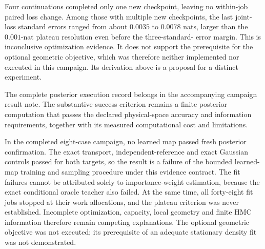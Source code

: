Four continuations completed only one new checkpoint, leaving no within-job
paired loss change. Among those with multiple new checkpoints, the last
joint-loss standard errors ranged from about $0.0035$ to $0.0078$ nats,
larger than the $0.001$-nat plateau resolution even before the three-standard-
error margin. This is inconclusive optimization evidence. It does not support
the prerequisite for the optional geometric objective, which was therefore
neither implemented nor executed in this campaign. Its derivation above is a
proposal for a distinct experiment.

The complete posterior execution record belongs in the accompanying campaign
result note. The substantive success criterion remains a finite posterior
computation that passes the declared physical-space accuracy and information
requirements, together with its measured computational cost and limitations.

In the completed eight-case campaign, no learned map passed fresh posterior
confirmation. The exact transport, independent-reference and exact Gaussian
controls passed for both targets, so the result is a failure of the bounded
learned-map training and sampling procedure under this evidence contract. The
fit failures cannot be attributed solely to importance-weight estimation,
because the exact conditional oracle teacher also failed. At the same time,
all forty-eight fit jobs stopped at their work allocations, and the plateau
criterion was never established. Incomplete optimization, capacity, local
geometry and finite HMC information therefore remain competing explanations.
The optional geometric objective was not executed; its prerequisite of an
adequate stationary density fit was not demonstrated.



